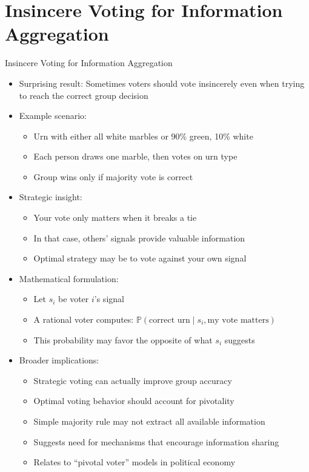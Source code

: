 \documentclass[10pt,handout]{beamer}
\begin{document}
\section{Insincere Voting for Information Aggregation}

\begin{frame}{Insincere Voting for Information Aggregation}
  \begin{itemize}[<+->]
    \item Surprising result: Sometimes voters should vote insincerely even when trying to reach the correct group decision
    \item Example scenario:
      \begin{itemize}
        \item Urn with either all white marbles or 90\% green, 10\% white
        \item Each person draws one marble, then votes on urn type
        \item Group wins only if majority vote is correct
      \end{itemize}
    \item Strategic insight:
      \begin{itemize}
        \item Your vote only matters when it breaks a tie
        \item In that case, others' signals provide valuable information
        \item Optimal strategy may be to vote against your own signal
      \end{itemize}
    \item Mathematical formulation:
      \begin{itemize}
        \item Let $s_i$ be voter $i$'s signal
        \item A rational voter computes: $\mathbb{P}(\text{correct urn} \mid s_i, \text{my vote matters})$
        \item This probability may favor the opposite of what $s_i$ suggests
      \end{itemize}
    \item Broader implications:
      \begin{itemize}
        \item Strategic voting can actually improve group accuracy
        \item Optimal voting behavior should account for pivotality
        \item Simple majority rule may not extract all available information
        \item Suggests need for mechanisms that encourage information sharing
        \item Relates to ``pivotal voter'' models in political economy
      \end{itemize}
  \end{itemize}
\end{frame}
\end{document}
